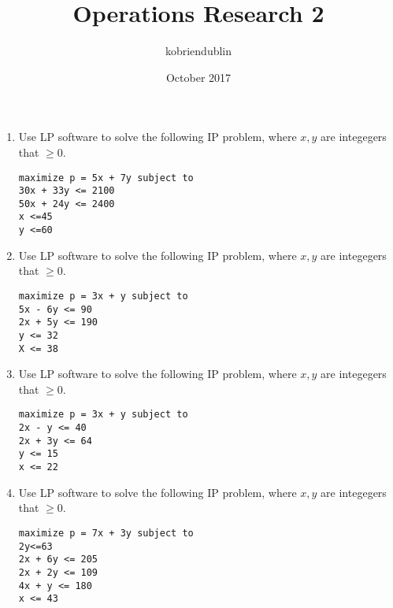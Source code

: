 \documentclass{article}
\title{Operations Research 2}
\author{kobriendublin }
\date{October 2017}
\begin{document}
\begin{enumerate}




\item Use LP software to solve the following IP problem, where $x,y$ are integegers that $\geq 0$.
\begin{framed}
\begin{verbatim}
maximize p = 5x + 7y subject to
30x + 33y <= 2100
50x + 24y <= 2400
x <=45
y <=60

\end{verbatim}
\end{framed}






\item Use LP software to solve the following IP problem, where $x,y$ are integegers that $\geq 0$.
\begin{framed}
\begin{verbatim}
maximize p = 3x + y subject to
5x - 6y <= 90
2x + 5y <= 190
y <= 32
X <= 38
\end{verbatim}
\end{framed}




\item Use LP software to solve the following IP problem, where $x,y$ are integegers that $\geq 0$.
\begin{framed}
\begin{verbatim}
maximize p = 3x + y subject to
2x - y <= 40
2x + 3y <= 64
y <= 15
x <= 22
\end{verbatim}
\end{framed}



\item Use LP software to solve the following IP problem, where $x,y$ are integegers that $\geq 0$.
\begin{framed}
\begin{verbatim}
maximize p = 7x + 3y subject to
2y<=63
2x + 6y <= 205
2x + 2y <= 109
4x + y <= 180
x <= 43
\end{verbatim}
\end{framed}


\end{enumerate}
\end{document}
